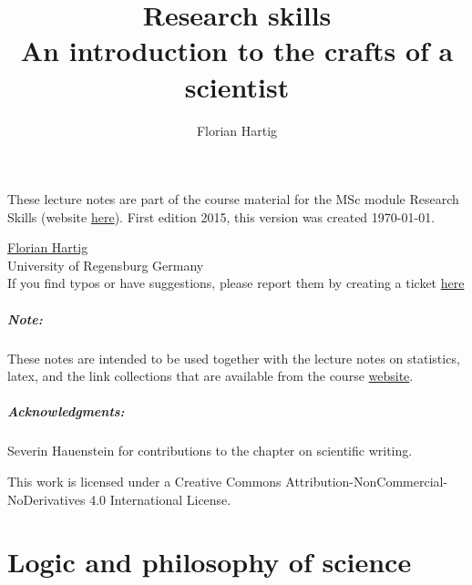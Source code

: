 \documentclass{tufte-book}
\title{Research skills\\
\large{An introduction to the crafts of a scientist}}
\author{Florian Hartig}
\begin{document}
\let\cleardoublepage\clearpage
\maketitle


\thispagestyle{empty}
\null

\begin{fullwidth}
These lecture notes are part of the course material for the MSc module Research Skills (website \href{http://florianhartig.github.io/ResearchSkills/}{here}). First edition 2015, this version was created \today.\\[0.5cm]
\end{fullwidth}

\href{http://www.uni-regensburg.de/biologie-vorklinische-medizin/theoretische-oekologie/mitarbeiter/hartig/index.html}{Florian Hartig}\\
University of Regensburg
Germany\\[0.2cm]
If you find typos or have suggestions, please report them by creating a ticket \href{https://github.com/florianhartig/ResearchSkills/issues}{here}

\paragraph{Note:} These notes are intended to be used together with the lecture notes on statistics, latex, and the link collections that are available from the course \href{http://florianhartig.github.io/ResearchSkills/}{website}.


\paragraph{Acknowledgments:}Severin Hauenstein for contributions to the chapter on scientific writing.


\vfill
\begin{fullwidth}
This work is licensed under a Creative Commons Attribution-NonCommercial-NoDerivatives 4.0 International License.
\end{fullwidth}


\newpage
\tableofcontents

\newpage



\chapter{Logic and philosophy of science}
\end{document}
